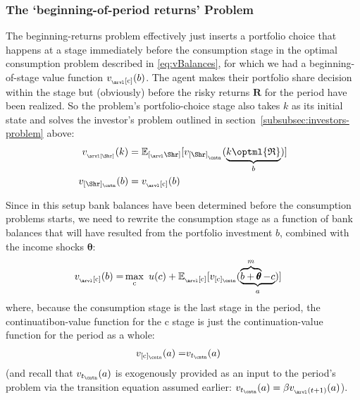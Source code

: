 \documentclass[titlepage, headings=optiontotocandhead]{Resources/texmf-local/tex/latex/econtex}
\begin{document}
\subsubsection{The `beginning-of-period returns' Problem}\label{subsubsec:beginning-returns}
The beginning-returns problem effectively just inserts a portfolio choice that happens at a {stage} immediately before the consumption {stage} in the optimal consumption problem described in \eqref{eq:vBalances}, for which we had a beginning-of-{stage} value function $v_{_\arvl[\mathrm{c}]}(b)$.  The agent makes their portfolio share decision within the {stage} but (obviously) before the risky returns ${\mathbf{R}}$ for the {period} have been realized.  So the problem's portfolio-choice {stage} also takes $k$ as its initial state and solves the investor's problem outlined in section~\ref{subsubsec:investors-problem} above:
\begin{equation}\begin{gathered}\begin{aligned}
  v_{_\arvl[\Shr]}(k) & = {\mathbb{E}}_{[_\arvl\Shr]}[v_{[\Shr]_{_\cntn}}(\underbrace{k\optml{\mathfrak{R}}}_{b})]
\\v_{[\Shr]_\cntn}(b)  & = v_{_\arvl[\mathrm{c}]}(b)
    \end{aligned}\end{gathered}\end{equation}

Since in this setup bank balances have been determined before the consumption problems starts, we need to rewrite the consumption {stage}  as a function of bank balances that will have resulted from the portfolio investment $b$, combined with the income shocks $\pmb{\theta}$:
\begin{equation}\begin{gathered}\begin{aligned}
      v_{_\arvl[\mathrm{c}]}(b) = & \max_{\mathrm{c}}~ u(c) + {\mathbb{E}}_{_\arvl[\mathrm{c}]}[v_{[\mathrm{c}]_\cntn}(\underbrace{\overbrace{b+\pmb{\theta}}^{m}-c}_{a})]
    \end{aligned}\end{gathered}\end{equation}
where, because the consumption {stage} is the last {stage} in the {period}, the continuatibon-value function for the $\mathrm{c}$ {stage} is just the continuation-value function for the period as a whole:
\begin{equation}\begin{gathered}\begin{aligned}
      v_{[\mathrm{c}]_\cntn}(a) = & v_{t_\cntn}(a)
    \end{aligned}\end{gathered}\end{equation}
(and recall that $v_{t_\cntn}(a)$ is exogenously provided as an input to the {period}'s problem via the transition equation assumed earlier: $v_{t_\cntn}(a)=\beta v_{_\arvl(t+1)}(a)$).
\end{document}
